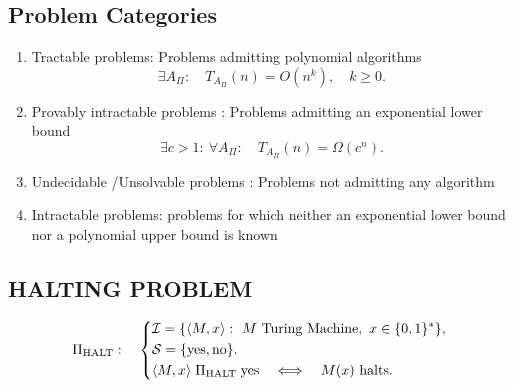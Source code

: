\subsection{Problem Categories}
\begin{enumerate}
\item Tractable problems: Problems admitting polynomial algorithms
\[
\exists A_\Pi:\quad T_{A_\Pi}(n)=O(n^k),\quad k\geq0.
\]
\item Provably intractable problems : Problems admitting an exponential lower bound
\[
\exists c>1:\ \forall A_\Pi:\quad T_{A_\Pi}(n)=\Omega(c^n).
\]
\item Undecidable /Unsolvable problems : Problems not admitting any algorithm 
\item Intractable problems: problems for which neither an exponential lower bound nor a polynomial upper bound is known
\end{enumerate}

\subsection{HALTING PROBLEM}
\[
\Pi_{\mathrm{HALT}}:\quad\left\{\begin{aligned}
& \mathcal I=\{\langle M,x\rangle:\ M\text{ Turing Machine},\ x\in\bits^*\},\\
& \mathcal S=\{\mathrm{yes},\mathrm{no}\}.\\
& \langle M,x\rangle\mathrel\Pi_{\mathrm{HALT}}\mathrm{yes}
\quad\Longleftrightarrow\quad M(x)\text{ halts}.
\end{aligned}\right.
\]
